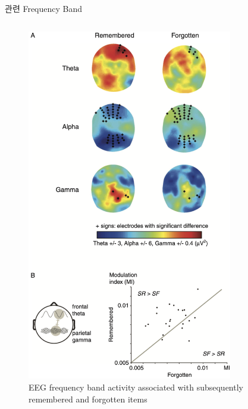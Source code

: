 \documentclass{beamer}
\begin{document}
\begin{frame}{관련 Frequency Band}
\begin{columns}
\begin{column}{0.38\textwidth}
\begin{figure}
        \includegraphics[width=0.8\textwidth]{image/remember_EEG}
        \caption{EEG frequency band activity associated with subsequently remembered and forgotten items}
      \end{figure}
    \end{column}
  \end{columns}
\end{frame}
\end{document}

